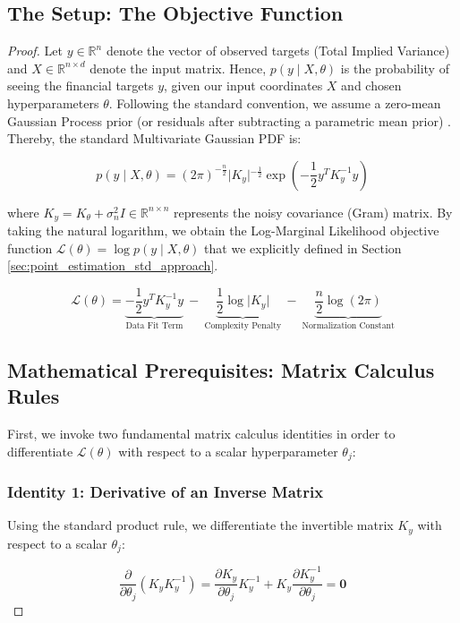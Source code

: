 \documentclass[12pt,oneside]{report}
\theoremstyle{definition}
\theoremstyle{remark}
\begin{document}
\subsection{The Setup: The Objective Function}
\begin{proof}
Let $y \in \mathbb{R}^n$ denote the vector of observed targets (Total Implied Variance) and $X \in \mathbb{R}^{n \times d}$ denote the input matrix. Hence, $p(y \mid X, \theta)$ is the probability of seeing the financial targets $y$, given our input coordinates $X$ and chosen hyperparameters $\theta$. Following the standard convention, we assume a zero-mean Gaussian Process prior (or residuals after subtracting a parametric mean prior) \cite{rasmussen2006gp}. Thereby, the standard Multivariate Gaussian PDF is:

$$p(y \mid X, \theta) = (2\pi)^{-\frac{n}{2}} \vert{}K_y\vert{}^{-\frac{1}{2}} \exp \left( -\frac{1}{2} y^T K_y^{-1} y \right)$$

where $K_y = K_\theta + \sigma_n^2 I \in \mathbb{R}^{n \times n}$ represents the noisy covariance (Gram) matrix. By taking the natural logarithm, we obtain the Log-Marginal Likelihood objective function $\mathcal{L}(\theta) = \log p(y \mid X, \theta)$ that we explicitly defined in Section \ref{sec:point_estimation_std_approach}.

\begin{equation}
\mathcal{L}(\theta) = \underbrace{-\frac{1}{2} y^T K_y^{-1} y}_{\text{Data Fit Term}} \ - \ \underbrace{\frac{1}{2} \log \vert{}K_y\vert{}}_{\text{Complexity Penalty}} \ - \ \underbrace{\frac{n}{2} \log (2\pi)}_{\text{Normalization Constant}}
\label{eq:lml_objective_function}
\end{equation}

\subsection{Mathematical Prerequisites: Matrix Calculus Rules}
First, we invoke two fundamental matrix calculus identities in order to differentiate $\mathcal{L}(\theta)$ with respect to a scalar hyperparameter $\theta_j$:

\subsubsection{Identity 1: Derivative of an Inverse Matrix}
Using the standard product rule, we differentiate the invertible matrix $K_y$ with respect to a scalar $\theta_j$:

\begin{equation}
\frac{\partial}{\partial \theta_j} (K_y K_y^{-1}) = \frac{\partial K_y}{\partial \theta_j} K_y^{-1} + K_y \frac{\partial K_y^{-1}}{\partial \theta_j} = \mathbf{0}
\label{eq:derivative_inverse_matrix}
\end{equation}


\end{proof}
\end{document}
